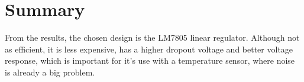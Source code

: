 \section{Summary}\label{sec:temp_summary_ch2}
From the results, the chosen design is the LM7805 linear regulator. Although not as efficient, it is less expensive, has a higher dropout voltage and better voltage response, which is important for it's use with a temperature sensor, where noise is already a big problem.



